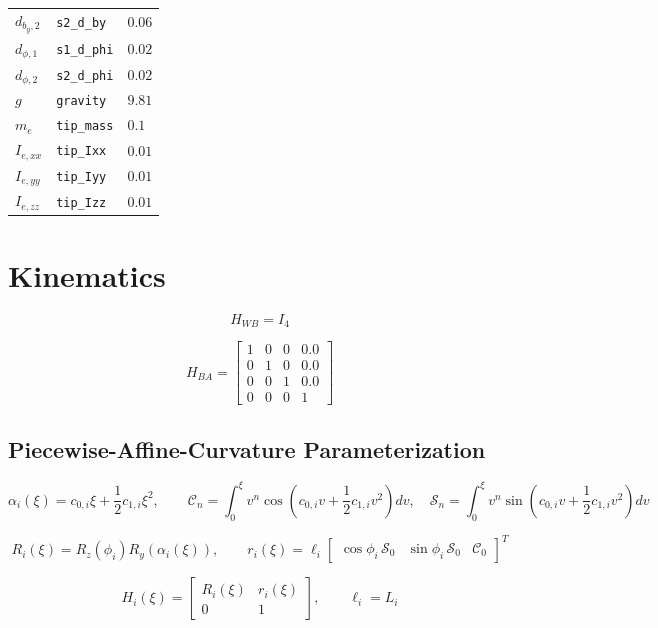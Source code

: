 \documentclass[11pt]{article}
\begin{document}
\begin{longtable}{lll}
$d_{b_y,2}$ & \texttt{s2\_d\_by} & $0.06$ \\
$d_{\phi,1}$ & \texttt{s1\_d\_phi} & $0.02$ \\
$d_{\phi,2}$ & \texttt{s2\_d\_phi} & $0.02$ \\
$g$ & \texttt{gravity} & $9.81$ \\
$m_e$ & \texttt{tip\_mass} & $0.1$ \\
$I_{e,xx}$ & \texttt{tip\_Ixx} & $0.01$ \\
$I_{e,yy}$ & \texttt{tip\_Iyy} & $0.01$ \\
$I_{e,zz}$ & \texttt{tip\_Izz} & $0.01$ \\
\hline
\end{longtable}

\section{Kinematics}
\begin{equation}
H_{WB}=I_4
\end{equation}

\begin{equation}
H_{BA}=\begin{bmatrix}1 & 0 & 0 & 0.0\\0 & 1 & 0 & 0.0\\0 & 0 & 1 & 0.0\\0 & 0 & 0 & 1\end{bmatrix}\label{eq:mount-transform}
\end{equation}

\subsection{Piecewise-Affine-Curvature Parameterization}
\begin{equation}
\alpha_i(\xi)=c_{0,i}\xi+\frac12c_{1,i}\xi^2,\qquad \mathcal C_n=\int_0^\xi v^n\cos\!\left(c_{0,i}v+\frac12c_{1,i}v^2\right)dv,\quad \mathcal S_n=\int_0^\xi v^n\sin\!\left(c_{0,i}v+\frac12c_{1,i}v^2\right)dv
\end{equation}

\begin{equation}
R_i(\xi)=R_z(\phi_i)R_y(\alpha_i(\xi)),\qquad r_i(\xi)=\ell_i\begin{bmatrix}\cos\phi_i\,\mathcal S_0&\sin\phi_i\,\mathcal S_0&\mathcal C_0\end{bmatrix}^{T}
\end{equation}

\begin{equation}
H_i(\xi)=\begin{bmatrix}R_i(\xi)&r_i(\xi)\\0&1\end{bmatrix},\qquad \ell_i=L_i\label{eq:local-transform}
\end{equation}
\end{document}
